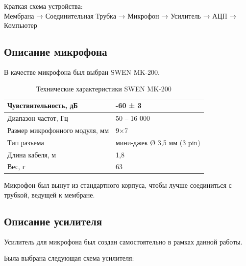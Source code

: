 \documentclass[14pt]{extarticle}
\begin{document}
\begin{center}
Краткая схема устройства:\\
\noindent\small{{Мембрана → Соединительная Трубка → Микрофон → Усилитель → АЦП → Компьютер}}
\end{center}


\subsection{Описание микрофона}
В качестве микрофона был выбран SWEN MK-200. \\

\begin{table}[h]
\centering
\label{my-label}
\begin{tabular}{|l|l|}
\hline
Чувствительность, дБ           & -60 ± 3                    \\ \hline
Диапазон частот, Гц            & 50 – 16 000                \\ \hline
Размер микрофонного модуля, мм & 9×7                        \\ \hline
Тип разъема                    & мини-джек Ø 3,5 мм (3 pin) \\ \hline
Длина кабеля, м                & 1,8                        \\ \hline
Вес, г                         & 63                         \\ \hline
\end{tabular}
\caption{Технические характеристики SWEN MK-200}
\end{table}

Микрофон был вынут из стандартного корпуса, чтобы лучше соединиться с трубкой, ведущей к мембране.

\subsection{Описание усилителя}
Усилитель для микрофона был создан самостоятельно в рамках данной работы.

Была выбрана следующая схема усилителя:
\end{document}

